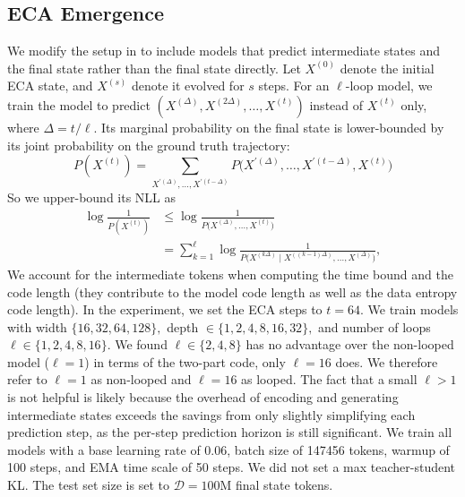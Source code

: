 \documentclass[twoside]{article}
\newcommand{\D}{\mathcal{D}}
\begin{document}
\subsection{ECA Emergence} \label{app:eca-emergence}
We modify the setup in  to include models that predict intermediate states and the final state rather than the final state directly. Let $X^{(0)}$ denote the initial ECA state, and $X^{(s)}$ denote it evolved for $s$ steps. For an $\ell$-loop model, we train the model to predict $(X^{(\Delta)}, X^{(2\Delta)}, \ldots, X^{(t)})$ instead of $X^{(t)}$ only, where $\Delta = t/\ell.$ Its marginal probability on the final state is lower-bounded by its joint probability on the ground truth trajectory: 
%
%
%
\begin{equation}
    P(X^{(t)}) = \sum_{X^{\prime(\Delta)},\ldots,X^{\prime(t-\Delta)}} P\!\big(X^{\prime(\Delta)},\ldots,X^{\prime(t-\Delta)},X^{(t)}\big)
\end{equation}
So we upper-bound its NLL as
%
%
%
\begin{align}
\log\frac{1}{P(X^{(t)})}
&\le
\log\frac{1}{P\!\big(X^{(\Delta)},\ldots,X^{(t)}\big)} \nonumber\\
&=
\sum_{k=1}^{\ell}
\log\frac{1}{P\!\big(X^{(k\Delta)} \mid X^{((k-1)\Delta)},\ldots,X^{(\Delta)}\big)},
\end{align}
We account for the intermediate tokens when computing the time bound and the code length (they contribute to the model code length as well as the data entropy code length).
In the experiment, we set the ECA steps to $t=64.$ We train models with width $\{16,32,64,128\},$ depth $\in \{1,2,4,8,16,32\},$ and number of loops $\ell \in \{1,2,4,8,16\}.$ We found $\ell \in \{2,4,8\}$ has no advantage over the non-looped model ($\ell=1$) in terms of the two-part code, only $\ell=16$ does. We therefore refer to $\ell=1$ as non-looped and $\ell=16$ as looped. The fact that a small $\ell > 1$ is not helpful is likely because the overhead of encoding and generating intermediate states exceeds the savings from only slightly simplifying each prediction step, as the per-step prediction horizon is still significant. We train all models with a base learning rate of 0.06, batch size of 147456 tokens, warmup of 100 steps, and EMA time scale of 50 steps. We did not set a max teacher-student KL. The test set size is set to $\D=100$M final state tokens.
\end{document}
